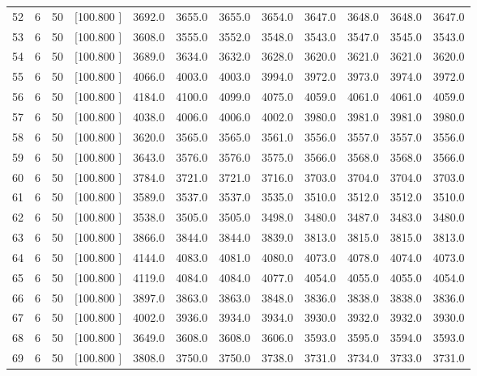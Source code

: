 \documentclass[12pt,a4paper]{article}
\begin{document}
\begin{center}
{\begin{tabular}{r r r r r r r r r r r r}
  52&  6& 50&[100.800   ]&  3692.0&  3655.0&  3655.0&  3654.0&  3647.0&  3648.0&  3648.0&  3647.0\\[-0.02in]
  53&  6& 50&[100.800   ]&  3608.0&  3555.0&  3552.0&  3548.0&  3543.0&  3547.0&  3545.0&  3543.0\\[-0.02in]
  54&  6& 50&[100.800   ]&  3689.0&  3634.0&  3632.0&  3628.0&  3620.0&  3621.0&  3621.0&  3620.0\\[-0.02in]
  55&  6& 50&[100.800   ]&  4066.0&  4003.0&  4003.0&  3994.0&  3972.0&  3973.0&  3974.0&  3972.0\\[-0.02in]
  56&  6& 50&[100.800   ]&  4184.0&  4100.0&  4099.0&  4075.0&  4059.0&  4061.0&  4061.0&  4059.0\\[-0.02in]
  57&  6& 50&[100.800   ]&  4038.0&  4006.0&  4006.0&  4002.0&  3980.0&  3981.0&  3981.0&  3980.0\\[-0.02in]
  58&  6& 50&[100.800   ]&  3620.0&  3565.0&  3565.0&  3561.0&  3556.0&  3557.0&  3557.0&  3556.0\\[-0.02in]
  59&  6& 50&[100.800   ]&  3643.0&  3576.0&  3576.0&  3575.0&  3566.0&  3568.0&  3568.0&  3566.0\\[-0.02in]
  60&  6& 50&[100.800   ]&  3784.0&  3721.0&  3721.0&  3716.0&  3703.0&  3704.0&  3704.0&  3703.0\\[-0.02in]
  61&  6& 50&[100.800   ]&  3589.0&  3537.0&  3537.0&  3535.0&  3510.0&  3512.0&  3512.0&  3510.0\\[-0.02in]
  62&  6& 50&[100.800   ]&  3538.0&  3505.0&  3505.0&  3498.0&  3480.0&  3487.0&  3483.0&  3480.0\\[-0.02in]
  63&  6& 50&[100.800   ]&  3866.0&  3844.0&  3844.0&  3839.0&  3813.0&  3815.0&  3815.0&  3813.0\\[-0.02in]
  64&  6& 50&[100.800   ]&  4144.0&  4083.0&  4081.0&  4080.0&  4073.0&  4078.0&  4074.0&  4073.0\\[-0.02in]
  65&  6& 50&[100.800   ]&  4119.0&  4084.0&  4084.0&  4077.0&  4054.0&  4055.0&  4055.0&  4054.0\\[-0.02in]
  66&  6& 50&[100.800   ]&  3897.0&  3863.0&  3863.0&  3848.0&  3836.0&  3838.0&  3838.0&  3836.0\\[-0.02in]
  67&  6& 50&[100.800   ]&  4002.0&  3936.0&  3934.0&  3934.0&  3930.0&  3932.0&  3932.0&  3930.0\\[-0.02in]
  68&  6& 50&[100.800   ]&  3649.0&  3608.0&  3608.0&  3606.0&  3593.0&  3595.0&  3594.0&  3593.0\\[-0.02in]
  69&  6& 50&[100.800   ]&  3808.0&  3750.0&  3750.0&  3738.0&  3731.0&  3734.0&  3733.0&  3731.0\\[-0.02in]

\end{tabular}}
\end{center}
\end{document}
